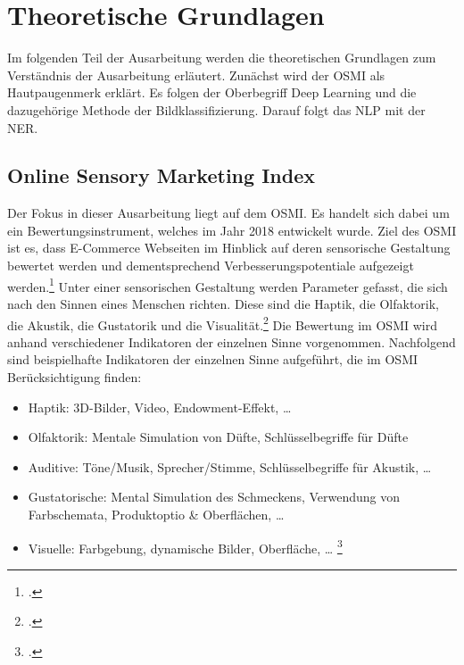 \newpage
\section{Theoretische Grundlagen}
Im folgenden Teil der Ausarbeitung werden die theoretischen Grundlagen zum Verständnis der Ausarbeitung erläutert.
Zunächst wird der \ac{OSMI} als Hautpaugenmerk erklärt. Es folgen der Oberbegriff Deep Learning und die dazugehörige Methode der Bildklassifizierung.
Darauf folgt das \ac{NLP} mit der \ac{NER}.

\subsection{Online Sensory Marketing Index}

Der Fokus in dieser Ausarbeitung liegt auf dem \acl{OSMI}. Es handelt sich dabei um ein Bewertungsinstrument, welches im Jahr 2018 entwickelt wurde.
Ziel des \ac{OSMI} ist es, dass E-Commerce Webseiten im Hinblick auf deren sensorische Gestaltung bewertet werden und dementsprechend Verbesserungspotentiale aufgezeigt werden.\footcite[\vglf][]{hamacher2018}
Unter einer sensorischen Gestaltung werden Parameter gefasst, die sich nach den Sinnen eines Menschen richten. Diese sind die Haptik, die Olfaktorik, die Akustik, die Gustatorik und die Visualität.\footcite[\vglf][ \& 862]{zou2018}
Die Bewertung im \ac{OSMI} wird anhand verschiedener Indikatoren der einzelnen Sinne vorgenommen. Nachfolgend sind beispielhafte Indikatoren der einzelnen Sinne aufgeführt, die im \ac{OSMI} Berücksichtigung finden:

\begin{itemize}
    \item Haptik: 3D-Bilder, Video, Endowment-Effekt, …
    \item Olfaktorik: Mentale Simulation von Düfte, Schlüsselbegriffe für Düfte
    \item Auditive: Töne/Musik, Sprecher/Stimme, Schlüsselbegriffe für Akustik, …
    \item Gustatorische: Mental Simulation des Schmeckens, Verwendung von
    Farbschemata, Produktoptio \& Oberflächen, …
    \item Visuelle: Farbgebung, dynamische Bilder, Oberfläche, … \footcite[\vglf][-56]{hamacher2018}
\end{itemize}

